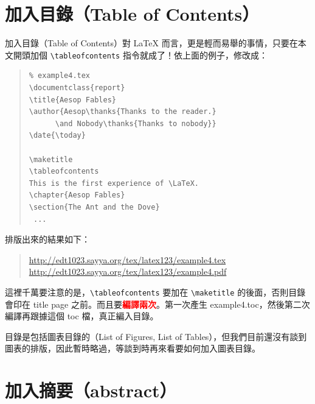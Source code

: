 \section{加入目錄（Table of Contents）}
\label{sec;toc}

加入目錄（Table of Contents）對 \LaTeX{} 而言，更是輕而易舉的事情，只要在本文開頭加個
\verb=\tableofcontents=
指令就成了！依上面的例子，修改成：

\begin{quote}
   \begin{verbatim}
% example4.tex
\documentclass{report}
\title{Aesop Fables}
\author{Aesop\thanks{Thanks to the reader.}
      \and Nobody\thanks{Thanks to nobody}}
\date{\today}

\maketitle
\tableofcontents
This is the first experience of \LaTeX.
\chapter{Aesop Fables}
\section{The Ant and the Dove}
 ...
\end{verbatim}
\end{quote}

排版出來的結果如下：

\begin{quote}
   \url{http://edt1023.sayya.org/tex/latex123/example4.tex}\\
   \url{http://edt1023.sayya.org/tex/latex123/example4.pdf}
\end{quote}

這裡千萬要注意的是，\verb|\tableofcontents| 要加在 \verb|\maketitle| 的後面，否則目錄會印在 title page 之前。而且要\textcolor{red}{\bf 編譯兩次}。第一次產生 {\ttfamily example4.toc}，然後第二次編譯再跟據這個 {\ttfamily toc} 檔，真正編入目錄。

目錄是包括圖表目錄的（List of Figures, List of Tables），但我們目前還沒有談到圖表的排版，因此暫時略過，等談到時再來看要如何加入圖表目錄。

\section{加入摘要（abstract）}
\label{sec:abstract}


